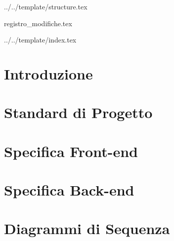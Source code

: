 


\def\DOCUMENTO{Definizione di Prodotto}
\def\VERSIONE{1.0.0}

\def\DESCRIZIONE{Documento che definisce in dettaglio l'architettura del prodotto \PROGETTO.}

\def\REDATTORE {Burlin Valerio \\ & Carraro Nicola \\ & Suierica Bogdan \\ & Ros Fabio}
\def\VERIFICATORE {Agostinetto Matteo}
\def\RESPONSABILE {Suierica Bogdan}

\def\USO {Esterno}

\def\DISTRIBUZIONE {\GRUPPO{}\\ & \COMMITTENTE{}\\ & \PROPONENTE{}\\}

\def\DESCRIZIONE {Documento che definisce in dettaglio l'architettura del prodotto \PROGETTO.}

\def\SCOPE {\textit{\$scope}}


\def\INDICE	{true}
\def\TABELLE {false}
\def\FIGURE {true}


 {../../template/structure.tex}

 {registro_modifiche.tex}

 {../../template/index.tex}


\section{Introduzione}

\newpage

\section{Standard di Progetto}

\newpage

\section{Specifica Front-end}

\newpage

\section{Specifica Back-end}

\newpage

\section{Diagrammi di Sequenza}

\newpage



